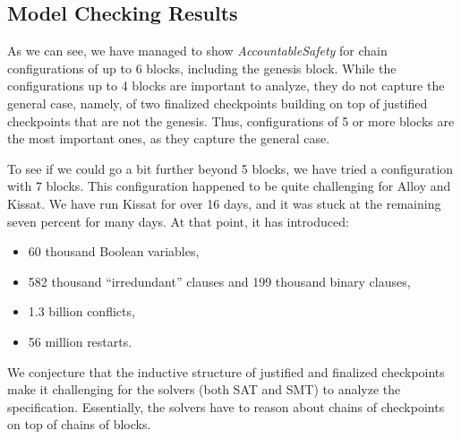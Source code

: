 \subsection{Model Checking Results}\label{sec:alloy-results}

As we can see, we have managed to show \textit{AccountableSafety} for chain
configurations of up to 6 blocks, including the genesis block. While the
configurations up to 4 blocks are important to analyze, they do not capture the
general case, namely, of two finalized checkpoints building on top of justified
checkpoints that are not the genesis. Thus, configurations of 5 or more blocks
are the most important ones, as they capture the general case.

To see if we could go a bit further beyond 5 blocks, we have tried a
configuration with 7 blocks. This configuration happened to be quite challenging
for Alloy and Kissat. We have run Kissat for over 16 days, and it was stuck at
the remaining seven percent for many days. At that point, it has introduced:

\begin{itemize}
  \item 60 thousand Boolean variables,
  \item 582 thousand ``irredundant'' clauses and 199 thousand binary clauses,
  \item 1.3 billion conflicts,
  \item 56 million restarts.
\end{itemize}

We conjecture that the inductive structure of justified and finalized
checkpoints make it challenging for the solvers (both SAT and SMT) to analyze
the specification. Essentially, the solvers have to reason about chains of
checkpoints on top of chains of blocks.

